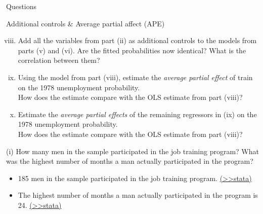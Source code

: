 \documentclass[
  10pt,
  ignorenonframetext,
]{beamer}
\providecommand{\tightlist}{%
  \setlength{\itemsep}{0pt}\setlength{\parskip}{0pt}}
\begin{document}
\begin{frame}{Questions}
\protect\hypertarget{questions-2}{}
\begin{block}{Additional controls \& Average partial affect (APE)}
\protect\hypertarget{additional-controls-average-partial-affect-ape}{}
\begin{enumerate}
[(i)]
\setcounter{enumi}{7}
\item
  Add all the variables from part (ii) as additional controls to the
  models from parts (v) and (vi). Are the fitted probabilities now
  identical? What is the correlation between them?
\item
  Using the model from part (viii), estimate the \emph{average partial
  effect} of train on the 1978 unemployment probability.\\
  How does the estimate compare with the OLS estimate from part (viii)?
\item
  Estimate the \emph{average partial effects} of the remaining
  regressors in (ix) on the 1978 unemployment probability.\\
  How does the estimate compare with the OLS estimate from part (viii)?
\end{enumerate}
\end{block}
\end{frame}

\begin{frame}{(i) How many men in the sample participated in the job
training program? What was the highest number of months a man actually
participated in the program?}
\protect\hypertarget{1-i}{}
\begin{itemize}
\tightlist
\item
  185 men in the sample participated in the job training program.
  \footnotesize \protect\hyperlink{numtrain}{(\textgreater\textgreater stata)}
  \normalsize
\end{itemize}

\vspace{0.8mm}

\begin{itemize}
\tightlist
\item
  The highest number of months a man actually participated in the
  program is 24.
  \footnotesize \protect\hyperlink{monsinexmax}{(\textgreater\textgreater stata)}
\end{itemize}
\end{frame}
\end{document}
